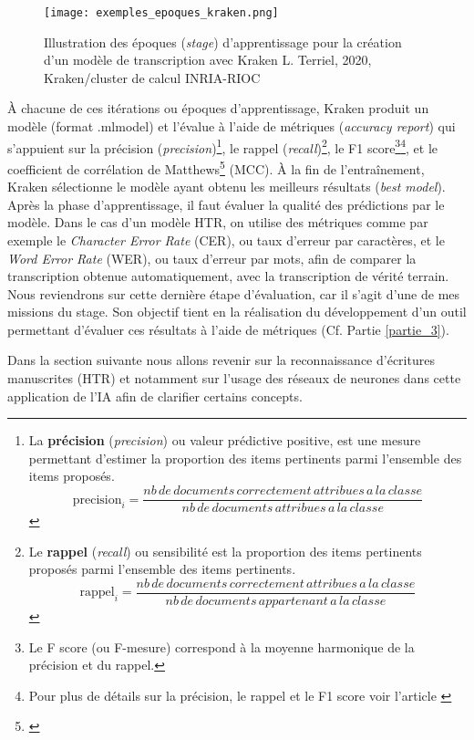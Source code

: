 \begin{figure}[h]
    \centering
    \centerline{\texttt{[image: exemples\_epoques\_kraken.png]}}
    \caption{Illustration des époques (\textit{stage}) d'apprentissage pour la création d'un modèle de transcription avec Kraken \textcopyright L. Terriel, 2020, Kraken/cluster de calcul INRIA-RIOC}
    \label{fig:epoque_kraken_prompt}
\end{figure}
\newpage
À chacune de ces itérations ou époques d'apprentissage, Kraken produit un modèle (format .mlmodel) et l'évalue à l'aide de métriques (\textit{accuracy report}) qui s'appuient sur la précision (\textit{precision})\footnote{La \textbf{précision} (\textit{precision}) ou valeur prédictive positive, est une mesure permettant d'estimer la proportion des items pertinents parmi l'ensemble des items proposés. 
$$ \text{precision}_i =
\frac{nb\,de\,documents\,correctement\,attribues\,a\,la\,classe}{nb\,de\,documents\,attribues\,a\,la\,classe} $$}, le rappel (\textit{recall})\footnote{Le \textbf{rappel} (\textit{recall}) ou sensibilité est la proportion des items pertinents proposés parmi l'ensemble des items pertinents.
$$ \text{rappel}_i = \frac{nb\,de\,documents\,correctement\,attribues\,a\,la\,classe}{nb\,de\,documents\,appartenant\,a\,la\,classe} $$}, le F1 score\footnote{Le F score (ou F-mesure) correspond à la moyenne harmonique de la précision et du rappel.}\footnote{Pour plus de détails sur la précision, le rappel et le F1 score voir l'article \cite{wikipedia_precision_nodate}}, et le coefficient de corrélation de Matthews\footnote{\cite{wikipedia_matthews_nodate}} (MCC). À la fin de l'entraînement, Kraken sélectionne le modèle ayant obtenu les meilleurs résultats (\textit{best model}).\\

Après la phase d'apprentissage, il faut évaluer la qualité des prédictions par le modèle. Dans le cas d'un modèle HTR, on utilise des métriques comme par exemple le \textit{Character Error Rate} (CER), ou taux d'erreur par caractères, et le \textit{Word Error Rate} (WER), ou taux d'erreur par mots, afin de comparer la transcription obtenue automatiquement, avec la transcription de vérité terrain. 
\newpage
Nous reviendrons sur cette dernière étape d'évaluation, car il s'agit d'une de mes missions du stage. Son objectif tient en la réalisation du développement d'un outil permettant d'évaluer ces résultats à l'aide de métriques (Cf. Partie \ref{partie_3}).

Dans la section suivante nous allons revenir sur la reconnaissance d'écritures manuscrites (HTR) et notamment sur l'usage des réseaux de neurones dans cette application de l'IA afin de clarifier certains concepts.
\newpage
